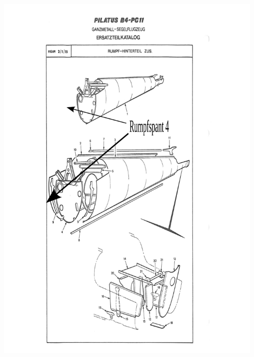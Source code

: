 \documentclass{article}
\begin{document}
\includegraphics[width=\textwidth,keepaspectratio]{b4_ersatzteil_katalog_fig_2_1_15_annotated}
\end{document}
